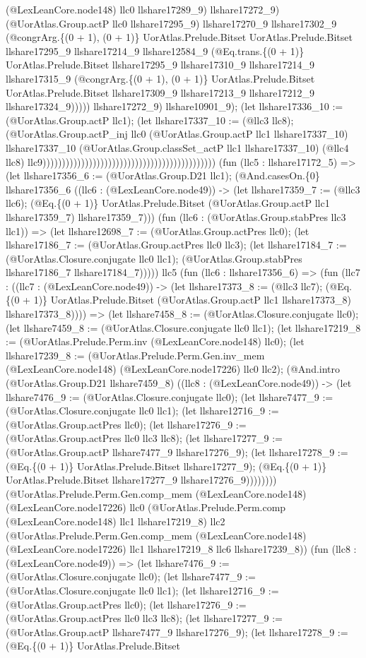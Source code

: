 \documentclass[11pt]{article}
\begin{document}
(@LexLeanCore.node148) llc0 llshare17289\_9) llshare17272\_9) (@UorAtlas.Group.actP llc0 llshare17295\_9) llshare17270\_9 llshare17302\_9 (@congrArg.\{(0 + 1), (0 + 1)\} UorAtlas.Prelude.Bitset UorAtlas.Prelude.Bitset llshare17295\_9 llshare17214\_9 llshare12584\_9 (@Eq.trans.\{(0 + 1)\} UorAtlas.Prelude.Bitset llshare17295\_9 llshare17310\_9 llshare17214\_9 llshare17315\_9 (@congrArg.\{(0 + 1), (0 + 1)\} UorAtlas.Prelude.Bitset UorAtlas.Prelude.Bitset llshare17309\_9 llshare17213\_9 llshare17212\_9 llshare17324\_9))))) llshare17272\_9) llshare10901\_9); (let llshare17336\_10 := (@UorAtlas.Group.actP llc1); (let llshare17337\_10 := (@llc3 llc8); (@UorAtlas.Group.actP\_inj llc0 (@UorAtlas.Group.actP llc1 llshare17337\_10) llshare17337\_10 (@UorAtlas.Group.classSet\_actP llc1 llshare17337\_10) (@llc4 llc8) llc9))))))))))))))))))))))))))))))))))))))))))))) (fun (llc5 : llshare17172\_5) => (let llshare17356\_6 := (@UorAtlas.Group.D21 llc1); (@And.casesOn.\{0\} llshare17356\_6 ((llc6 : (@LexLeanCore.node49)) -> (let llshare17359\_7 := (@llc3 llc6); (@Eq.\{(0 + 1)\} UorAtlas.Prelude.Bitset (@UorAtlas.Group.actP llc1 llshare17359\_7) llshare17359\_7))) (fun (llc6 : (@UorAtlas.Group.stabPres llc3 llc1)) => (let llshare12698\_7 := (@UorAtlas.Group.actPres llc0); (let llshare17186\_7 := (@UorAtlas.Group.actPres llc0 llc3); (let llshare17184\_7 := (@UorAtlas.Closure.conjugate llc0 llc1); (@UorAtlas.Group.stabPres llshare17186\_7 llshare17184\_7))))) llc5 (fun (llc6 : llshare17356\_6) => (fun (llc7 : ((llc7 : (@LexLeanCore.node49)) -> (let llshare17373\_8 := (@llc3 llc7); (@Eq.\{(0 + 1)\} UorAtlas.Prelude.Bitset (@UorAtlas.Group.actP llc1 llshare17373\_8) llshare17373\_8)))) => (let llshare7458\_8 := (@UorAtlas.Closure.conjugate llc0); (let llshare7459\_8 := (@UorAtlas.Closure.conjugate llc0 llc1); (let llshare17219\_8 := (@UorAtlas.Prelude.Perm.inv (@LexLeanCore.node148) llc0); (let llshare17239\_8 := (@UorAtlas.Prelude.Perm.Gen.inv\_mem (@LexLeanCore.node148) (@LexLeanCore.node17226) llc0 llc2); (@And.intro (@UorAtlas.Group.D21 llshare7459\_8) ((llc8 : (@LexLeanCore.node49)) -> (let llshare7476\_9 := (@UorAtlas.Closure.conjugate llc0); (let llshare7477\_9 := (@UorAtlas.Closure.conjugate llc0 llc1); (let llshare12716\_9 := (@UorAtlas.Group.actPres llc0); (let llshare17276\_9 := (@UorAtlas.Group.actPres llc0 llc3 llc8); (let llshare17277\_9 := (@UorAtlas.Group.actP llshare7477\_9 llshare17276\_9); (let llshare17278\_9 := (@Eq.\{(0 + 1)\} UorAtlas.Prelude.Bitset llshare17277\_9); (@Eq.\{(0 + 1)\} UorAtlas.Prelude.Bitset llshare17277\_9 llshare17276\_9)))))))) (@UorAtlas.Prelude.Perm.Gen.comp\_mem (@LexLeanCore.node148) (@LexLeanCore.node17226) llc0 (@UorAtlas.Prelude.Perm.comp (@LexLeanCore.node148) llc1 llshare17219\_8) llc2 (@UorAtlas.Prelude.Perm.Gen.comp\_mem (@LexLeanCore.node148) (@LexLeanCore.node17226) llc1 llshare17219\_8 llc6 llshare17239\_8)) (fun (llc8 : (@LexLeanCore.node49)) => (let llshare7476\_9 := (@UorAtlas.Closure.conjugate llc0); (let llshare7477\_9 := (@UorAtlas.Closure.conjugate llc0 llc1); (let llshare12716\_9 := (@UorAtlas.Group.actPres llc0); (let llshare17276\_9 := (@UorAtlas.Group.actPres llc0 llc3 llc8); (let llshare17277\_9 := (@UorAtlas.Group.actP llshare7477\_9 llshare17276\_9); (let llshare17278\_9 := (@Eq.\{(0 + 1)\} UorAtlas.Prelude.Bitset 
\end{document}

